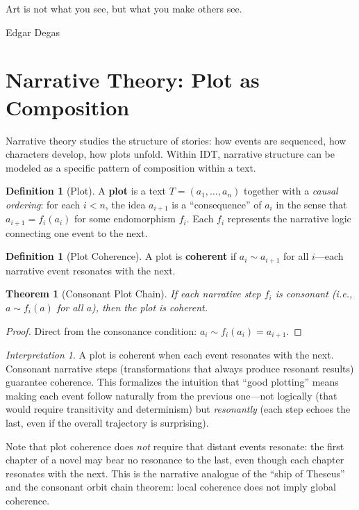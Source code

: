 \documentclass[11pt,openany]{book}
\theoremstyle{definition}
\newtheorem{definition}[axiom]{Definition}
\theoremstyle{plain}
\newtheorem{theorem}[axiom]{Theorem}
\theoremstyle{remark}
\newtheorem{interpretation}[axiom]{Interpretation}
\newcommand{\res}{\sim}                      %
\begin{document}
\epigraph{Art is not what you see, but what you make others see.}{Edgar Degas}

\section{Narrative Theory: Plot as Composition}

Narrative theory studies the structure of stories: how events are sequenced, how characters develop, how plots unfold. Within IDT, narrative structure can be modeled as a specific pattern of composition within a text.

\begin{definition}[Plot]
A \textbf{plot} is a text $T = (a_1, \ldots, a_n)$ together with a \emph{causal ordering}: for each $i < n$, the idea $a_{i+1}$ is a ``consequence'' of $a_i$ in the sense that $a_{i+1} = f_i(a_i)$ for some endomorphism $f_i$. Each $f_i$ represents the narrative logic connecting one event to the next.
\end{definition}

\begin{definition}[Plot Coherence]
A plot is \textbf{coherent} if $a_i \res a_{i+1}$ for all $i$---each narrative event resonates with the next.
\end{definition}

\begin{theorem}[Consonant Plot Chain]
If each narrative step $f_i$ is consonant (i.e., $a \res f_i(a)$ for all $a$), then the plot is coherent.
\end{theorem}

\begin{proof}
Direct from the consonance condition: $a_i \res f_i(a_i) = a_{i+1}$.
\end{proof}

\begin{interpretation}
A plot is coherent when each event resonates with the next. Consonant narrative steps (transformations that always produce resonant results) guarantee coherence. This formalizes the intuition that ``good plotting'' means making each event follow naturally from the previous one---not logically (that would require transitivity and determinism) but \emph{resonantly} (each step echoes the last, even if the overall trajectory is surprising).

Note that plot coherence does \emph{not} require that distant events resonate: the first chapter of a novel may bear no resonance to the last, even though each chapter resonates with the next. This is the narrative analogue of the ``ship of Theseus'' and the consonant orbit chain theorem: local coherence does not imply global coherence.
\end{interpretation}
\end{document}
